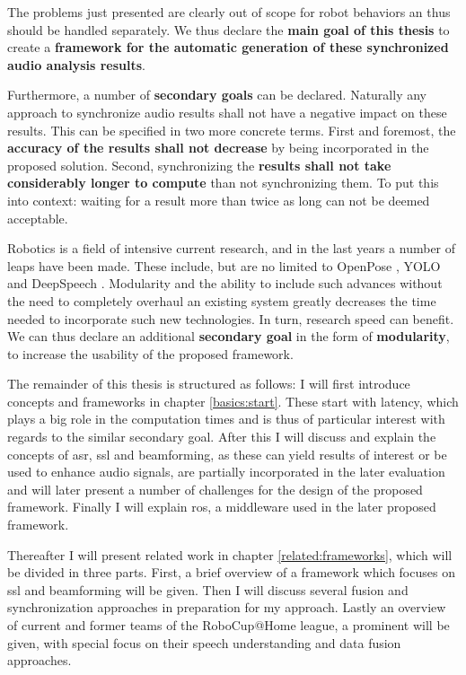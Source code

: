 The problems just presented are clearly out of scope for robot behaviors an thus should be handled separately.
We thus declare the \textbf{main goal of this thesis} to create a \textbf{framework for the automatic generation of these synchronized audio analysis results}.

Furthermore, a number of \textbf{secondary goals} can be declared.
Naturally any approach to synchronize audio results shall not have a negative impact on these results.
This can be specified in two more concrete terms.
First and foremost, the \textbf{accuracy of the results shall not decrease} by being incorporated in the proposed solution.
Second, synchronizing the \textbf{results shall not take considerably longer to compute} than not synchronizing them.
To put this into context: waiting for a result more than twice as long can not be deemed acceptable.


Robotics is a field of intensive current research, and in the last years a number of leaps have been made.
These include, but are no limited to OpenPose \cite{cao2018openpose}, YOLO \cite{yolov3} and DeepSpeech \cite{deepspeech}.
Modularity and the ability to include such advances without the need to completely overhaul an existing system greatly decreases the time needed to incorporate such new technologies.
In turn, research speed can benefit.
We can thus declare an additional \textbf{secondary goal} in the form of \textbf{modularity}, to increase the usability of the proposed framework.


The remainder of this thesis is structured as follows:
I will first introduce concepts and frameworks in chapter \ref{basics:start}.
These start with latency, which plays a big role in the computation times and is thus of particular interest with regards to the similar secondary goal.
After this I will discuss and explain the concepts of \gls{asr}, \gls{ssl} and beamforming, as these can yield results of interest or be used to enhance audio signals, are partially incorporated in the later evaluation and will later present a number of challenges for the design of the proposed framework.
Finally I will explain \gls{ros}, a middleware used in the later proposed framework.

Thereafter I will present related work in chapter \ref{related:frameworks}, which will be divided in three parts.
First, a brief overview of a framework which focuses on \gls{ssl} and beamforming will be given.
Then I will discuss several fusion and synchronization approaches in preparation for my approach.
Lastly an overview of current and former teams of the RoboCup@Home league, a prominent will be given, with special focus on their speech understanding and data fusion approaches.

